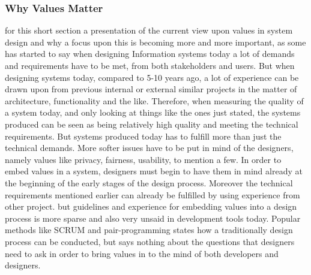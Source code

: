 
\subsubsection{Why Values Matter}
\citep[p. 65-66]{EthicsAndTechnologyDesign}for this short section a presentation of the current view upon values in system design and why a focus upon this is becoming more and more important, as some has started to say when designing Information systems today a lot of demands and requirements have to be met, from both stakeholders and users. But when designing systems today, compared to 5-10 years ago, a lot of experience can be drawn upon from previous internal or external similar projects in the matter of architecture, functionality and the like. Therefore, when measuring the quality of a system today, and only looking at things like the ones just stated, the systems produced can be seen as being relatively high quality and meeting the technical requirements. But systems produced today has to fulfill more than just the technical demands. More softer issues have to be put in mind of the designers, namely values like privacy, fairness, usability, to mention a few. In order to embed values in a system, designers must begin to have them in mind already at the beginning of the early stages of the design process. Moreover the technical requirements mentioned earlier can already be fulfilled by using experience from other project. but guidelines and experience for embedding values into a design process is more sparse and also very unsaid in development tools today. Popular methods like SCRUM and pair-programming states how a traditionally design process can be conducted, but says nothing about the questions that designers need to ask in order to bring values in to the mind of both developers and designers. 
